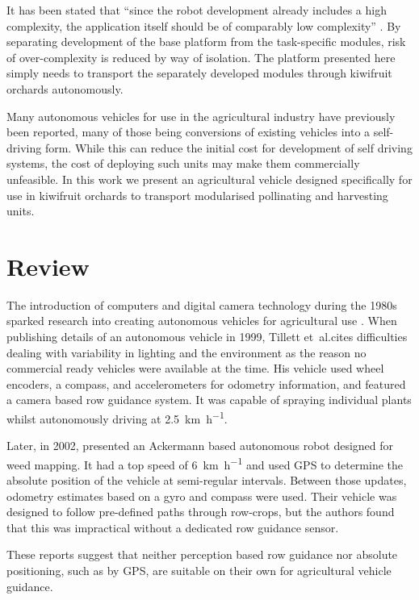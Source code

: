 \documentclass[preprint,authoryear,12pt]{elsarticle}
\begin{document}
    It has been stated that ``since the robot development already includes a high complexity, the application itself should be of comparably low complexity'' \citep{Ruckelshausen2009}.
    By separating development of the base platform from the task-specific modules, risk of over-complexity is reduced by way of isolation.
    The platform presented here simply needs to transport the separately developed modules through kiwifruit orchards autonomously.

    Many autonomous vehicles for use in the agricultural industry have previously been reported, many of those being conversions of existing vehicles into a self-driving form.
    While this can reduce the initial cost for development of self driving systems, the cost of deploying such units may make them commercially unfeasible.
    In this work we present an agricultural vehicle designed specifically for use in kiwifruit orchards to transport modularised pollinating and harvesting units.

\section{Review}
\label{sect:review}

    The introduction of computers and digital camera technology during the 1980s sparked research into creating autonomous vehicles for agricultural use \cite{Li2009}.
    When publishing details of an autonomous vehicle in 1999, Tillett et~al.\@ cites difficulties dealing with variability in lighting and the environment as the reason no commercial ready vehicles were available at the time.
    His vehicle used wheel encoders, a compass, and accelerometers for odometry information, and featured a camera based row guidance system.
    It was capable of spraying individual plants whilst autonomously driving at \SI{2.5}{\kilo\meter\per\hour}.
    
    Later, in 2002, \cite{Pedersen2002} presented an Ackermann based autonomous robot designed for weed mapping.
    It had a top speed of \SI{6}{\kilo\meter\per\hour} and used GPS to determine the absolute position of the vehicle at semi-regular intervals.
    Between those updates, odometry estimates based on a gyro and compass were used.
    Their vehicle was designed to follow pre-defined paths through row-crops, but the authors found that this was impractical without a dedicated row guidance sensor.

    These reports suggest that neither perception based row guidance nor absolute positioning, such as by GPS, are suitable on their own for agricultural vehicle guidance.
    
\end{document}
